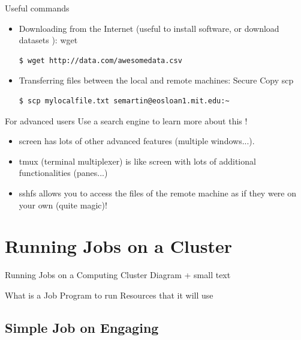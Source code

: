 \documentclass{beamer}
\begin{document}
\begin{frame}[fragile]{Useful commands}
  \begin{itemize}
  \item Downloading from the Internet (useful to install software, or download datasets ): \alert{wget}
  \begin{verbatim}
$ wget http://data.com/awesomedata.csv
  \end{verbatim}
  \item Transferring files between the local and remote machines: Secure Copy \alert{scp}
  \begin{verbatim}
$ scp mylocalfile.txt semartin@eosloan1.mit.edu:~
  \end{verbatim}

  \end{itemize}

  \pause

  \begin{block}{For advanced users}
    Use a search engine to learn more about this !
    \begin{itemize}
      \item \alert{screen} has lots of other advanced features (multiple windows...).
      \item \alert{tmux} (terminal multiplexer) is like screen with lots of additional functionalities (panes...)
      \item \alert{sshfs} allows you to access the files of the remote machine as if they were on your own (quite magic)!
    \end{itemize}
  \end{block}
\end{frame}

\section{Running Jobs on a Cluster}
\begin{frame}{Running Jobs on a Computing Cluster}
    Diagram + small text
\end{frame}

\begin{frame}{What is a Job}
    Program to run
    Resources that it will use
\end{frame}

\subsection{Simple Job on Engaging}
\end{document}
